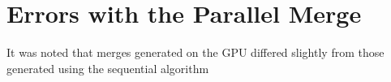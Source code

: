 \section{Errors with the Parallel Merge}
It was noted that merges generated on the GPU differed slightly from those generated using the sequential algorithm